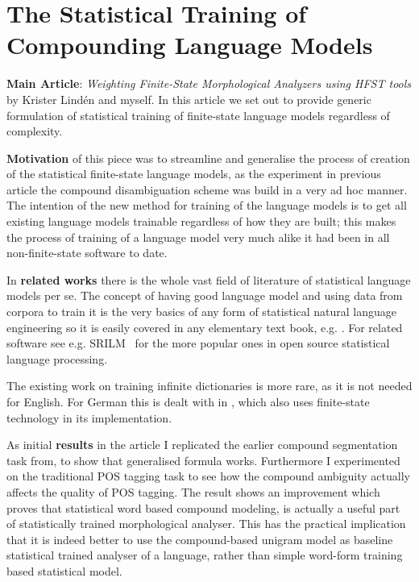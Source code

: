 \documentclass[officiallayout]{unihelcompling}
\begin{document}
\section{The Statistical Training of Compounding Language Models}
\label{sec:training-compounds}

\textbf{Main Article}: \emph{Weighting Finite-State Morphological Analyzers
using HFST tools} by Krister Lindén and myself. In this article we set out
to provide generic formulation of statistical training of finite-state
language models regardless of complexity.

\textbf{Motivation} of this piece was to streamline and generalise the process
of creation of the statistical finite-state language models, as the experiment
in previous article  the compound
disambiguation scheme was build in a very ad hoc manner. The intention of the
new method for training of the language models is to get all existing language
models trainable regardless of how they are built; this makes the process of
training of a language model very much alike it had been in all
non-finite-state software to date.

In \textbf{related works} there is the whole vast field of literature of
statistical language models per se. The concept of having good language model
and using data from corpora to train it is the very basics of any form of
statistical natural language engineering so it is easily covered in any
elementary text book, e.g. \citet{manning1999foundations}. For related software
see e.g.  SRILM~\citep{stolcke2002srilm} for the more popular ones in open
source statistical language processing.

The existing work on training infinite dictionaries is more rare, as it is not
needed for English. For German this is dealt with in
\citep{schiller2006german}, which also uses finite-state technology in its
implementation.

As initial \textbf{results} in the article I replicated the earlier compound
segmentation task from, to show that generalised formula works.
Furthermore I experimented on the traditional POS tagging task to see how the
compound ambiguity actually affects the quality of POS tagging. The result
shows an improvement which proves that statistical word based compound
modeling, is actually a useful part of statistically trained morphological
analyser. This has the practical implication that it is indeed better to
use the compound-based unigram model as baseline statistical trained analyser
of a language, rather than simple word-form training based statistical model.
\end{document}
